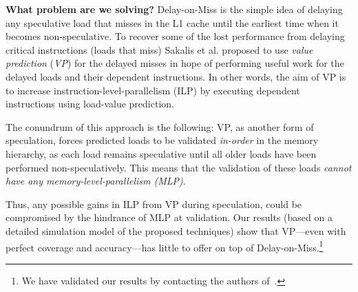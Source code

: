 \noindent \textbf{What problem are we solving?} Delay-on-Miss is the simple idea of delaying any speculative load that misses in the L1 cache until the earliest time when it becomes non-speculative. 
To recover some of the lost performance from delaying critical instructions (loads that miss) Sakalis et al. proposed to use \emph{value prediction} (\emph{VP}) for the delayed misses in hope of performing useful work for the delayed loads and their dependent instructions. In other words, the aim of VP is to increase instruction-level-parallelism (ILP) by executing dependent instructions using load-value prediction. 

The conundrum of this approach is the following: VP, as another form of speculation, forces predicted loads to be validated \emph{in-order} in the memory hierarchy, as each load remains speculative until all older loads have been performed non-speculatively. This means that the validation of these loads \emph{cannot have any memory-level-parallelism (MLP)}. 
%
%
Thus, any possible gains in ILP from VP during speculation, could be compromised by the hindrance of MLP at validation.
{
Our results (based on a detailed simulation model of the proposed techniques) show that VP---even with perfect coverage and accuracy---has little to offer on top of Delay-on-Miss.\footnote{We have 
validated our results by contacting the authors of~\cite{sakalis+:ISCA2019vp}.}}

